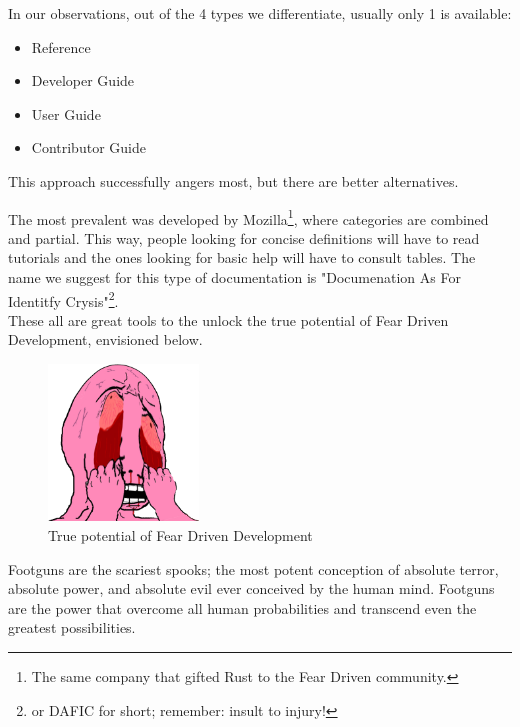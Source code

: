 \documentclass{book}
\begin{document}
    In our observations,
    out of the 4 types we differentiate,
    usually only 1 is available:
    \begin{itemize}
        \itemsep-0.5em 
        \item Reference
        \item Developer Guide
        \item User Guide
        \item Contributor Guide
    \end{itemize}
    This approach successfully angers most,
    but there are better alternatives.

    The most prevalent was developed by Mozilla\footnote{
        The same company that gifted Rust to the Fear Driven community.
    },
    where categories are combined and partial.
    This way,
    people looking for concise definitions will have to read tutorials
    and the ones looking for basic help will have to consult tables.
    The name we suggest for this type of documentation is
    "Documenation As For Identitfy Crysis"\footnote{
        or DAFIC for short; remember: insult to injury!
    }.
    \\

    These all are great tools to the unlock the true potential of Fear Driven Development,
    envisioned below.
    \\

    \begin{figure}[h!]
        \centering
        \includegraphics[width=40mm]{angry-pink-wojak.png}
        \caption{True potential of Fear Driven Development}
        \label{fig:method}
    \end{figure}


    Footguns are the scariest spooks;
    the most potent conception of absolute terror,
    absolute power,
    and absolute evil ever conceived by the human mind.
    Footguns are the power that overcome all human probabilities
    and transcend even the greatest possibilities.
    \\
\end{document}
